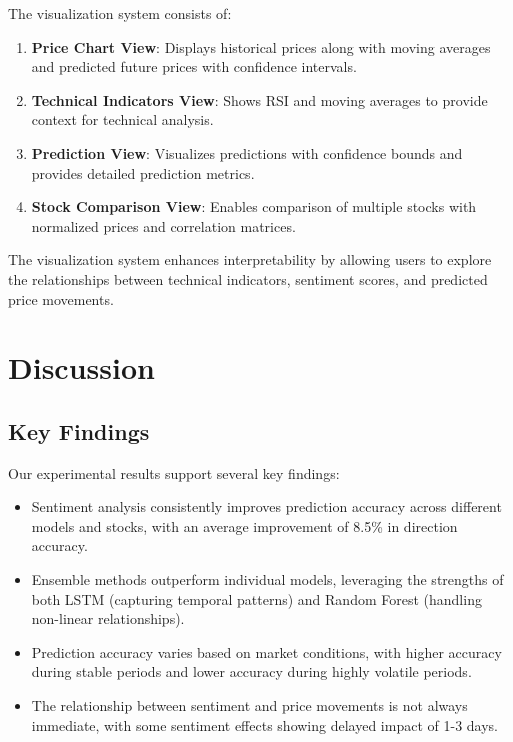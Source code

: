 \documentclass[review]{elsarticle}
\begin{document}
The visualization system consists of:

\begin{enumerate}
    \item \textbf{Price Chart View}: Displays historical prices along with moving averages and predicted future prices with confidence intervals.
    
    \item \textbf{Technical Indicators View}: Shows RSI and moving averages to provide context for technical analysis.
    
    \item \textbf{Prediction View}: Visualizes predictions with confidence bounds and provides detailed prediction metrics.
    
    \item \textbf{Stock Comparison View}: Enables comparison of multiple stocks with normalized prices and correlation matrices.
\end{enumerate}

The visualization system enhances interpretability by allowing users to explore the relationships between technical indicators, sentiment scores, and predicted price movements.

\section{Discussion}
\label{discussion}

\subsection{Key Findings}

Our experimental results support several key findings:

\begin{itemize}
    \item Sentiment analysis consistently improves prediction accuracy across different models and stocks, with an average improvement of 8.5\% in direction accuracy.
    
    \item Ensemble methods outperform individual models, leveraging the strengths of both LSTM (capturing temporal patterns) and Random Forest (handling non-linear relationships).
    
    \item Prediction accuracy varies based on market conditions, with higher accuracy during stable periods and lower accuracy during highly volatile periods.
    
    \item The relationship between sentiment and price movements is not always immediate, with some sentiment effects showing delayed impact of 1-3 days.
\end{itemize}
\end{document}
